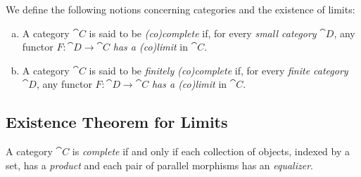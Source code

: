 \begin{definition}[Completeness]
\label{def:completeness-categories}
We define the following notions concerning categories and the existence of
limits:
\begin{enumerate}[(a)]\setlength\itemsep{0em}
\item A category \(\cat C\) is said to be \emph{(co)complete} if, for every
  \emph{small category} \(\cat D\), any functor \(F: \cat D \to \cat C\)
  \emph{has a (co)limit} in \(\cat C\).

\item A category \(\cat C\) is said to be \emph{finitely (co)complete} if, for
  every \emph{finite category} \(\cat D\), any functor \(F: \cat D \to \cat C\)
  \emph{has a (co)limit} in \(\cat C\).
\end{enumerate}
\end{definition}

\subsection{Existence Theorem for Limits}

\begin{theorem}
\label{thm:complete-category-prod-eq}
A category \(\cat C\) is \emph{complete} if and only if each collection of
objects, indexed by a set, has a \emph{product} and each pair of parallel
morphisms has an \emph{equalizer}.
\end{theorem}

